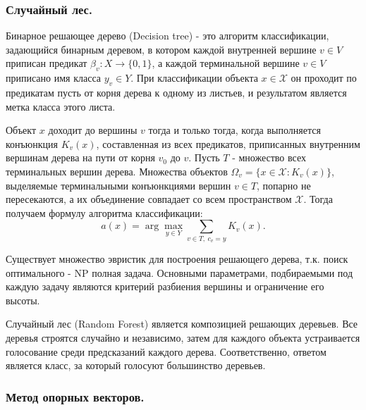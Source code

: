\documentclass[14pt]{extarticle}
\begin{document}
\subsubsection{Случайный лес.}

\par
Бинарное решающее дерево (Decision tree) - это алгоритм классификации, задающийся бинарным
деревом, в котором каждой внутренней вершине $v \in V$ приписан предикат 
$\beta_v:X\to\{0, 1\}$, а каждой терминальной вершине $v \in V$ приписано имя класса 
$y_v \in Y$. При классификации объекта $x \in \mathcal{X}$ он проходит по предикатам
пусть от корня дерева к одному из листьев, и результатом является метка класса этого листа.
\par
Объект $x$ доходит до вершины $v$ тогда и только тогда, когда выполняется конъюнкция
$K_v(x)$, составленная из всех предикатов, приписанных внутренним вершинам дерева
на пути от корня $v_0$ до $v$. Пусть $T$ - множество всех терминальных вершин дерева. 
Множества объектов $\Omega_v=\{x \in \mathcal{X} : K_v(x)\}$, выделяемые терминальными
конъюнкциями вершин $v \in T$, попарно не пересекаются, а их объединение совпадает
со всем пространством $\mathcal{X}$. Тогда получаем формулу алгоритма классификации:
\[
    a(x) = \arg\max_{y \in Y} \sum_{v \in T,\ c_v=y} K_v(x).
\]
\par
Существует множество эвристик для построения решающего дерева, т.к. поиск оптимального - 
NP полная задача. Основными параметрами, подбираемыми под каждую задачу являются
критерий разбиения вершины и ограничение его высоты.
\par
Случайный лес (Random Forest) является композицией решающих деревьев. Все деревья строятся
случайно и независимо, затем для каждого объекта устраивается голосование среди
предсказаний каждого дерева. Соответственно, ответом является класс, за который голосуют
большинство деревьев.

\subsubsection{Метод опорных векторов.}
\end{document}
